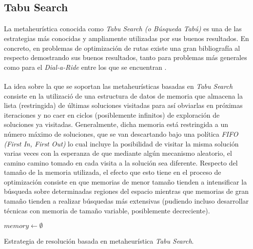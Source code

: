 \documentclass{subfiles}
\begin{document}
      \subsection{Tabu Search}
      \label{sec:solving_tabu}

        \paragraph{}
        La metaheurística conocida como \emph{Tabu Search (o Búsqueda Tabú)} es una de las estrategias más conocidas y ampliamente utilizadas por sus buenos resultados. En concreto, en problemas de optimización de rutas existe una gran bibliografía al respecto demostrando sus buenos resultados, tanto para problemas más generales como para el \emph{Dial-a-Ride} entre los que se encuentran \cite{gendreau1994tabu,cordeau2001unified,cordeau2003tabu}.

        \paragraph{}
        La idea sobre la que se soportan las metaheurísticas basadas en \emph{Tabu Search} consiste en la utilizació de una estructura de datos de memoria que almacena la lista (restringida) de últimas soluciones visitadas para así obviarlas en próximas iteraciones y no caer en ciclos (posiblemente infinitos) de exploración de soluciones ya visitadas. Generalmente, dicha memoria está restringida a un número máximo de soluciones, que se van descartando bajo una política \emph{FIFO (First In, First Out)} lo cual incluye la posibilidad de visitar la misma solución varias veces con la esperanza de que mediante algún mecanismo aleatorio, el camino camino tomado en cada visita a la solución sea diferente. Respecto del tamaño de la memoria utilizada, el efecto que esto tiene en el proceso de optimización consiste en que memorias de menor tamaño tienden a intensificar la búsqueda sobre determinadas regiones del espacio mientras que memorias de gran tamaño tienden a realizar búsquedas más extensivas (pudiendo incluso desarrollar técnicas con memoria de tamaño variable, posiblemente decreciente).

        \begin{algorithm}[ht]
          \SetAlgoLined
          $memory \gets \emptyset$\;
          \caption{Estrategia de resolución basada en metaheurística \emph{Tabu Search}.}
          \label{code:solving_tabu_search}
        \end{algorithm}
\end{document}
